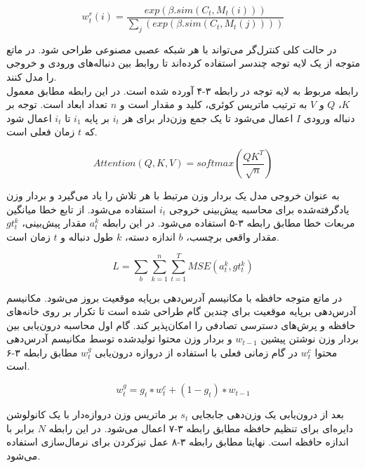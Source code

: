 \begin{equation}
w_t^r(i) = \frac{exp(\beta.sim(C_t,M_t(i)))}{\sum_j(exp(\beta.sim(C_t,M_t(j))))}
\end{equation}

در حالت کلی کنترل‌گر می‌تواند با هر شبکه عصبی مصنوعی طراحی شود. در ماتع متوجه از یک لایه توجه چندسر استفاده کرده‌اند تا روابط بین دنباله‌های ورودی و خروجی را مدل کنند. \cite{zhao2020cold}
\\

رابطه مربوط به لایه توجه در رابطه ۳-۴ آورده شده است. در این رابطه مطابق معمول $K$، $Q$ و $V$ به ترتیب ماتریس کوئری، کلید و مقدار است و $n$ تعداد ابعاد است. توجه بر دنباله ورودی $I$ اعمال می‌شود تا یک جمع وزن‌دار برای هر $i_t$ بر پایه $i_1$ تا $i_t$ اعمال شود که $t$ زمان فعلی است.\cite{zhao2020cold} 

\begin{equation}
Attention(Q,K,V) = softmax(\frac{QK^T}{\sqrt{n}})
\end{equation}

به عنوان خروجی مدل یک بردار وزن مرتبط با هر تلاش را یاد می‌گیرد و بردار وزن یادگرفته‌شده برای محاسبه پیش‌بینی خروجی $i_t$ استفاده می‌شود. از تابع خطا میانگین مربعات خطا مطابق رابطه ۳-۵ استفاده می‌شود. در این رابطه $a_t^k$ مقدار پیش‌بینی، $gt_t^k$ مقدار واقعی برچسب، $b$ اندازه دسته، $k$ طول دنباله و $t$ زمان است.\cite{zhao2020cold}

\begin{equation}
L = \sum_b \sum_{k=1}^n \sum_{t=1}^T MSE(a_t^k, gt_t^k)
\end{equation}

در ماتع متوجه حافظه با مکانیسم آدرس‌دهی برپایه موقعیت بروز می‌شود. مکانیسم آدرس‌دهی برپایه موقعیت برای چندین گام طراحی شده است تا تکرار بر روی خانه‌های حافظه و پرش‌های دسترسی تصادفی را امکان‌پذیر کند. گام اول محاسبه درون‌یابی بین بردار وزن نوشتن پیشین $w_{t-1}$ و بردار وزن محتوا تولیدشده توسط مکانیسم آدرس‌دهی محتوا $w_t^c$ در گام زمانی فعلی با استفاده از دروازه درون‌یابی $w_t^g$ مطابق رابطه ۳-۶ است.\cite{zhao2020cold}

\begin{equation}
w^g_t = g_t ∗ w^c_t + (1−g_t) ∗ w_{t−1}
\end{equation}

بعد از درون‌یابی یک وزن‌دهی جابجایی $s_t$ بر ماتریس وزن دروازه‌دار با یک کانولوشن دایره‌ای برای تنظیم حافظه مطابق رابطه ۳-۷ اعمال می‌شود. در این رابطه $N$ برابر با اندازه حافظه است. نهایتا مطابق رابطه ۳-۸ عمل تیزکردن برای نرمال‌سازی استفاده می‌شود.\cite{zhao2020cold}

